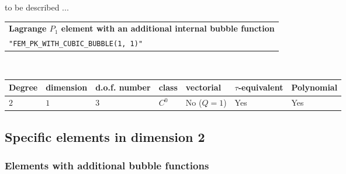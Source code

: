 \documentclass[11pt,a4paper]{article}
\begin{document}
to be described ...

\begin{center}
\begin{tabular}{|m{16.11cm}|} \hline 
{ \bf Lagrange $P_1$ element with an additional internal bubble function}\\
{\tt "FEM\_PK\_WITH\_CUBIC\_BUBBLE(1, 1)"} 
\end{tabular} \\ \vspace{-1pt} 
\begin{tabular}{|m{2cm}|m{2cm}|m{2.5cm}|m{1.2cm}|m{2cm}|m{2cm}|m{1.8cm}|} \hline 
Degree & dimension & d.o.f. number & class & vectorial & \mbox{$\tau$-equivalent} & Polynomial\\ \hline
$2$ & $1$ & $3$ & $C^0$ & No \mbox{($Q = 1$)} & Yes & Yes\\ \hline
\end{tabular}
\end{center}

\subsection{Specific elements in dimension 2}
\subsubsection{Elements with additional bubble functions}
\end{document}
